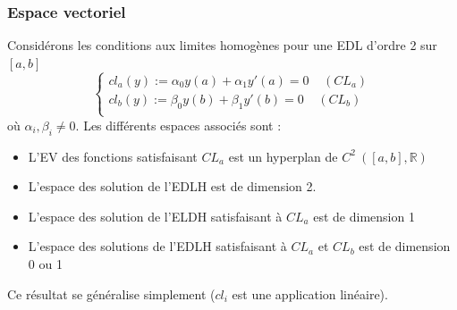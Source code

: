 \documentclass[11pt, a4paper, openany]{book}
\begin{document}
		\subsubsection{Espace vectoriel}
		Considérons les conditions aux limites homogènes pour une EDL d'ordre 2 sur $[a,b]$
		\begin{equation}
			\left\{\begin{array}{l}
			cl_a(y) := \alpha_0y(a) + \alpha_1y'(a) = 0\ \ \ \ \ (CL_a)\\
			cl_b(y) := \beta_0y(b) + \beta_1y'(b) = 0\ \ \ \ \ (CL_b)\\
			\end{array}\right.
		\end{equation}
		où $\alpha_i,\beta_i \neq 0$. Les différents espaces associés sont :
		\begin{itemize}
			\item L'EV des fonctions satisfaisant $CL_a$ est un hyperplan de $C^2\ ([a,b], \mathbb{R})$
			\item L'espace des solution de l'EDLH est de dimension 2.
			\item L'espace des solution de l'ELDH satisfaisant à $CL_a$ est de dimension 1
			\item L'espace des solutions de l'EDLH satisfaisant à $CL_a$ et $CL_b$ est de dimension 0 ou 1
		\end{itemize}
		Ce résultat se généralise simplement ($cl_i$ est une application linéaire).
									
\end{document}
